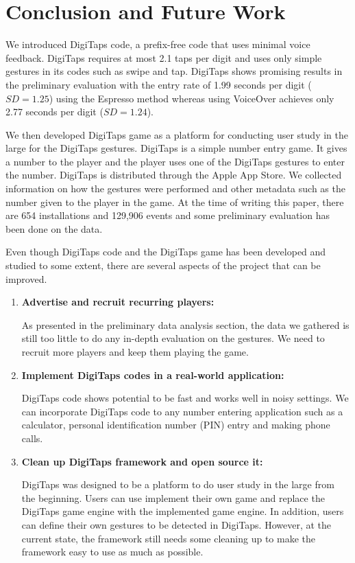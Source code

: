 \section{Conclusion and Future Work}
\label{sec:future}
We introduced DigiTaps code, a prefix-free code that uses minimal voice feedback. DigiTaps requires at most 2.1 taps per digit and uses only simple gestures in its codes such as swipe and tap. DigiTaps shows promising results in the preliminary evaluation with the entry rate of 1.99 seconds per digit ($SD = 1.25$) using the Espresso method whereas using VoiceOver achieves only 2.77 seconds per digit ($SD = 1.24$).

We then developed DigiTaps game as a platform for conducting user study in the large for the DigiTaps gestures. DigiTaps is a simple number entry game. It gives a number to the player and the player uses one of the DigiTaps gestures to enter the number. DigiTaps is distributed through the Apple App Store. We collected information on how the gestures were performed and other metadata such as the number given to the player in the game. At the time of writing this paper, there are 654 installations and 129,906 events and some preliminary evaluation has been done on the data.

Even though DigiTaps code and the DigiTaps game has been developed and studied to some extent, there are several aspects of the project that can be improved.
\begin{enumerate}
  \item \textbf{Advertise and recruit recurring players:}
  \par
   As presented in the preliminary data analysis section, the data we gathered is still too little to do any in-depth evaluation on the gestures. We need to recruit more players and keep them playing the game.

  \item \textbf{Implement DigiTaps codes in a real-world application:}
  \par
  DigiTaps code shows potential to be fast and works well in noisy settings. We can incorporate DigiTaps code to any number entering application such as a calculator, personal identification number (PIN) entry and making phone calls.

  \item \textbf{Clean up DigiTaps framework and open source it:}
  \par
  DigiTaps was designed to be a platform to do user study in the large from the beginning. Users can use implement their own game and replace the DigiTaps game engine with the implemented game engine. In addition, users can define their own gestures to be detected in DigiTaps. However, at the current state, the framework still needs some cleaning up to make the framework easy to use as much as possible.
\end{enumerate}


